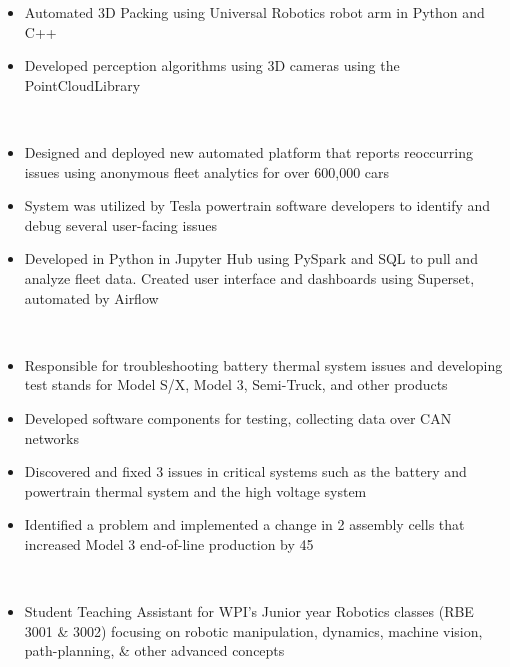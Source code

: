 {}
    \begin{itemize}
        \item Automated 3D Packing using Universal Robotics robot arm in Python and C++
        \item Developed perception algorithms using 3D cameras using the PointCloudLibrary
    \end{itemize}
\divider\\
    \begin{itemize}
        \item Designed and deployed new automated platform that reports reoccurring issues using anonymous fleet analytics for over 600,000 cars
        \item System was utilized by Tesla powertrain software developers to identify and debug several user-facing issues
        \item Developed in Python in Jupyter Hub using PySpark and SQL to pull and analyze fleet data. Created user interface and dashboards using Superset, automated by Airflow
    \end{itemize}
\divider\\
    \begin{itemize}
        \item Responsible for troubleshooting battery thermal system issues and developing test stands for Model S/X, Model 3, Semi-Truck, and other products
        \item Developed software components for testing, collecting data over CAN networks
        \item Discovered and fixed 3 issues in critical systems such as the battery and powertrain thermal system and the high voltage system
        \item Identified a problem and implemented a change in 2 assembly cells that increased Model 3 end-of-line production by 45
    \end{itemize}
\divider\\
    \begin{itemize}
        \item Student Teaching Assistant for WPI’s Junior year Robotics classes (RBE 3001 \& 3002) focusing on robotic manipulation, dynamics, machine vision, path-planning, \& other advanced concepts
    \end{itemize}